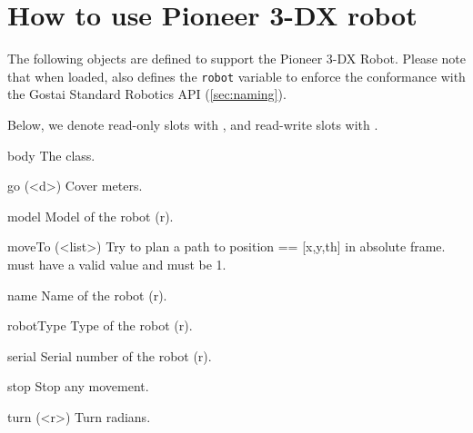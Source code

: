 \section{How to use Pioneer 3-DX robot}

The following objects are defined to support the Pioneer 3-DX Robot.  Please
note that when loaded,  also defines the \lstinline{robot}
variable to enforce the conformance with the Gostai Standard Robotics API
(\autoref{sec:naming}).

Below, we denote read-only slots with , and read-write slots with
.

\let\subsectionOrig\subsection
\let\subsection\subsectionObject

\subsection{P3dx}
\begin{urbiscriptapi}
\item[body] The  class.


\item[go](<d>) Cover  meters.


\item[model] Model of the robot (r).


\item[moveTo](<list>) Try to plan a path to position  == [x,y,th]
  in absolute frame.   must have a valid value and
   must be 1.


\item[name] Name of the robot (r).


\item[robotType] Type of the robot (r).


\item[serial] Serial number of the robot (r).


\item[stop] Stop any movement.


\item[turn](<r>) Turn  radians.
\end{urbiscriptapi}

